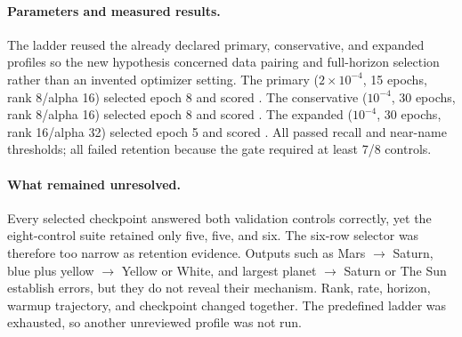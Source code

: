 \paragraph{Parameters and measured results.}
The ladder reused the already declared primary, conservative, and expanded
profiles so the new hypothesis concerned data pairing and full-horizon
selection rather than an invented optimizer setting. The primary
($2\times10^{-4}$, 15 epochs, rank 8/alpha 16) selected epoch 8 and scored
. The conservative ($10^{-4}$, 30 epochs, rank 8/alpha
16) selected epoch 8 and scored . The expanded
($10^{-4}$, 30 epochs, rank 16/alpha 32) selected epoch 5 and scored
. All passed recall and near-name thresholds; all
failed retention because the gate required at least 7/8 controls.

\paragraph{What remained unresolved.}
Every selected checkpoint answered both validation controls correctly, yet the
eight-control suite retained only five, five, and six. The six-row selector was
therefore too narrow as retention evidence. Outputs such as Mars $\rightarrow$
Saturn, blue plus yellow $\rightarrow$ Yellow or White, and largest planet
$\rightarrow$ Saturn or The Sun establish errors, but they do not reveal their
mechanism. Rank, rate, horizon, warmup trajectory, and checkpoint changed
together. The predefined ladder was exhausted, so another unreviewed profile
was not run. 
